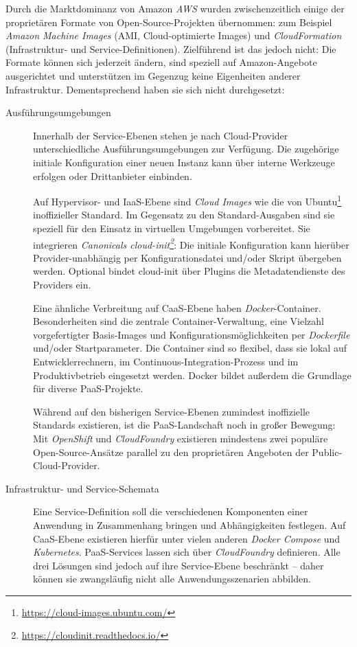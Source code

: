 Durch die Marktdominanz von Amazon \emph{AWS} wurden zwischenzeitlich einige der proprietären Formate von Open-Source-Projekten übernommen: zum Beispiel \emph{Amazon Machine Images} (AMI, Cloud-optimierte Images) und \emph{CloudFormation} (Infrastruktur- und Service-Definitionen). Zielführend ist das jedoch nicht: Die Formate können sich jederzeit ändern, sind speziell auf Amazon-Angebote ausgerichtet und unterstützen im Gegenzug keine Eigenheiten anderer Infrastruktur. Dementsprechend haben sie sich nicht durchgesetzt:

\begin{description}
	
	\item[Ausführungsumgebungen] Innerhalb der Service-Ebenen stehen je nach Cloud-Provider unterschiedliche Ausführungsumgebungen zur Verfügung. Die zugehörige initiale Konfiguration einer neuen Instanz kann über interne Werkzeuge erfolgen oder Drittanbieter einbinden.
	
		Auf Hypervisor- und IaaS-Ebene sind \emph{Cloud Images} wie die von Ubuntu\footnote{\url{https://cloud-images.ubuntu.com/}} inoffizieller Standard. Im Gegensatz zu den Standard-Ausgaben sind sie speziell für den Einsatz in virtuellen Umgebungen vorbereitet. Sie integrieren \emph{Canonicals cloud-init\footnote{\url{https://cloudinit.readthedocs.io/}}}: Die initiale Konfiguration kann hierüber Provider-unabhängig per Konfigurationsdatei und/oder Skript übergeben werden. Optional bindet cloud-init über Plugins die Metadatendienste des Providers ein.
		
		Eine ähnliche Verbreitung auf CaaS-Ebene haben \emph{Docker}-Container. Besonderheiten sind die zentrale Container-Verwaltung, eine Vielzahl vorgefertigter Basis-Images und Konfigurationsmöglichkeiten per \emph{Dockerfile} und/oder Startparameter. Die Container sind so flexibel, dass sie lokal auf Entwicklerrechnern, im Continuous-Integration-Prozess und im Produktivbetrieb eingesetzt werden. Docker bildet außerdem die Grundlage für diverse PaaS-Projekte.
		
		Während auf den bisherigen Service-Ebenen zumindest inoffizielle Standards existieren, ist die PaaS-Landschaft noch in großer Bewegung: Mit \emph{Open\-Shift} und \emph{Cloud\-Foundry} existieren mindestens zwei populäre Open-Source-Ansätze parallel zu den proprietären Angeboten der Public-Cloud-Provider.
	
	\item[Infrastruktur- und Service-Schemata] Eine Service-Definition soll die verschiedenen Komponenten einer Anwendung in Zusammenhang bringen und Abhängigkeiten festlegen. Auf CaaS-Ebene existieren hierfür unter vielen anderen \emph{Docker Compose} und \emph{Kubernetes}. PaaS-Services lassen sich über \emph{CloudFoundry} definieren. Alle drei Lösungen sind jedoch auf ihre Service-Ebene beschränkt -- daher können sie zwangsläufig nicht alle Anwendungsszenarien abbilden.
	

\end{description}
